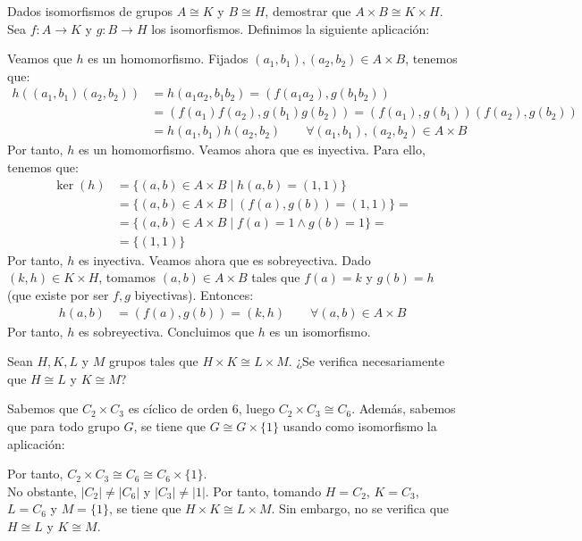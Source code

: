 \begin{ejercicio}
    Dados isomorfismos de grupos $A\cong K$ y $B\cong H$, demostrar que $A \times B\cong K\times H$.\\

    Sea $f:A\to K$ y $g:B\to H$ los isomorfismos. Definimos la siguiente aplicación:

    Veamos que $h$ es un homomorfismo. Fijados $(a_1,b_1),(a_2,b_2)\in A\times B$, tenemos que:
    \begin{align*}
        h((a_1,b_1)(a_2,b_2)) &= h(a_1a_2,b_1b_2) = (f(a_1a_2),g(b_1b_2))\\
        &= (f(a_1)f(a_2),g(b_1)g(b_2)) = (f(a_1),g(b_1))(f(a_2),g(b_2))\\
        &= h(a_1,b_1)h(a_2,b_2)\qquad \forall (a_1,b_1),(a_2,b_2)\in A\times B
    \end{align*}
    Por tanto, $h$ es un homomorfismo. Veamos ahora que es inyectiva. Para ello, tenemos que:
    \begin{align*}
        \ker(h) &= \{(a,b)\in A\times B\mid h(a,b)=(1,1)\}\\
        &= \{(a,b)\in A\times B\mid (f(a),g(b))=(1,1)\} =\\&= \{(a,b)\in A\times B\mid f(a)=1\wedge g(b)=1\} =\\&= \{(1,1)\}
    \end{align*}
    Por tanto, $h$ es inyectiva. Veamos ahora que es sobreyectiva. Dado $(k,h)\in K\times H$, tomamos $(a,b)\in A\times B$ tales que $f(a)=k$ y $g(b)=h$ (que existe por ser $f,g$ biyectivas). Entonces:
    \begin{align*}
        h(a,b) &= (f(a),g(b)) = (k,h) \qquad \forall (a,b)\in A\times B
    \end{align*}
    Por tanto, $h$ es sobreyectiva. Concluimos que $h$ es un isomorfismo.

\end{ejercicio}

\begin{ejercicio}
    Sean $H,K,L$ y $M$ grupos tales que $H\times K\cong L\times M$. ¿Se verifica necesariamente que $H\cong L$ y $K\cong M$?

    Sabemos que $C_2\times C_3$ es cíclico de orden $6$, luego $C_2\times C_3\cong C_6$. Además, sabemos que para todo grupo $G$, se tiene que $G\cong G\times \{1\}$ usando como isomorfismo la aplicación:

    Por tanto, $C_2\times C_3\cong C_6\cong C_6\times \{1\}$.\\

    No obstante, $|C_2|\neq |C_6|$ y $|C_3|\neq |1|$. Por tanto, tomando $H=C_2$, $K=C_3$, $L=C_6$ y $M=\{1\}$, se tiene que $H\times K\cong L\times M$. Sin embargo, no se verifica que $H\cong L$ y $K\cong M$.
\end{ejercicio}

